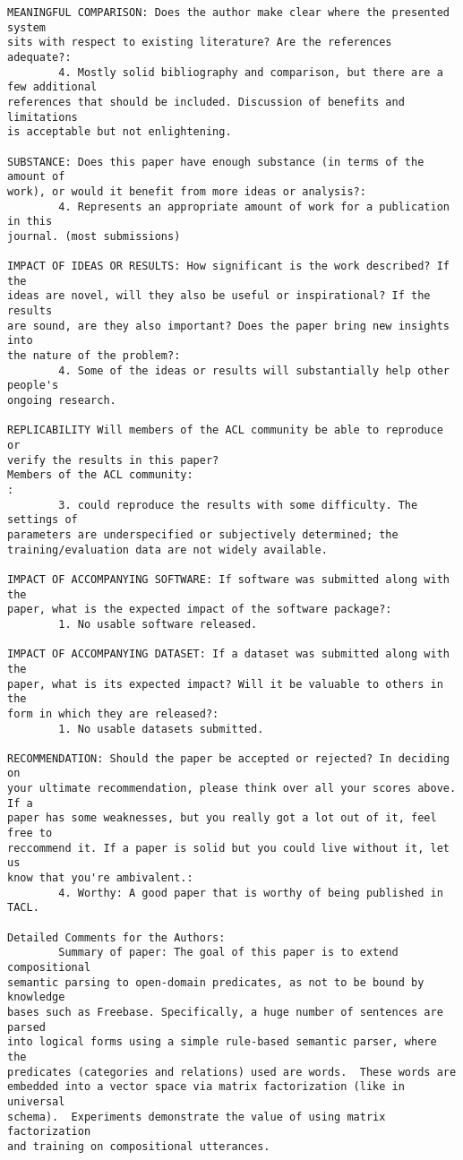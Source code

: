\documentclass{article}[11pt,oneside]
\begin{document}
\begin{verbatim}
MEANINGFUL COMPARISON: Does the author make clear where the presented system
sits with respect to existing literature? Are the references adequate?:
        4. Mostly solid bibliography and comparison, but there are a few additional
references that should be included. Discussion of benefits and limitations
is acceptable but not enlightening.

SUBSTANCE: Does this paper have enough substance (in terms of the amount of
work), or would it benefit from more ideas or analysis?:
        4. Represents an appropriate amount of work for a publication in this
journal. (most submissions)

IMPACT OF IDEAS OR RESULTS: How significant is the work described? If the
ideas are novel, will they also be useful or inspirational? If the results
are sound, are they also important? Does the paper bring new insights into
the nature of the problem?:
        4. Some of the ideas or results will substantially help other people's
ongoing research.

REPLICABILITY Will members of the ACL community be able to reproduce or
verify the results in this paper?
Members of the ACL community:
:
        3. could reproduce the results with some difficulty. The settings of
parameters are underspecified or subjectively determined; the
training/evaluation data are not widely available.

IMPACT OF ACCOMPANYING SOFTWARE: If software was submitted along with the
paper, what is the expected impact of the software package?:
        1. No usable software released.

IMPACT OF ACCOMPANYING DATASET: If a dataset was submitted along with the
paper, what is its expected impact? Will it be valuable to others in the
form in which they are released?:
        1. No usable datasets submitted.

RECOMMENDATION: Should the paper be accepted or rejected? In deciding on
your ultimate recommendation, please think over all your scores above. If a
paper has some weaknesses, but you really got a lot out of it, feel free to
reccommend it. If a paper is solid but you could live without it, let us
know that you're ambivalent.:
        4. Worthy: A good paper that is worthy of being published in TACL.

Detailed Comments for the Authors:
        Summary of paper: The goal of this paper is to extend compositional
semantic parsing to open-domain predicates, as not to be bound by knowledge
bases such as Freebase. Specifically, a huge number of sentences are parsed
into logical forms using a simple rule-based semantic parser, where the
predicates (categories and relations) used are words.  These words are
embedded into a vector space via matrix factorization (like in universal
schema).  Experiments demonstrate the value of using matrix factorization
and training on compositional utterances.


\end{verbatim}
\end{document}
